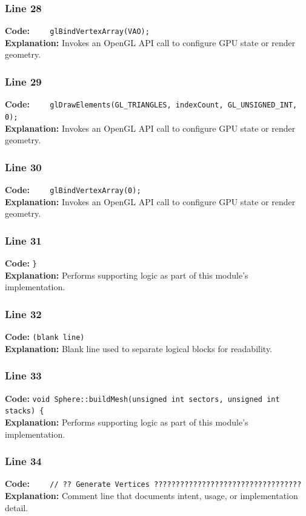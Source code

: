 \documentclass[11pt,a4paper]{article}
\begin{document}
\subsubsection*{Line 28}
\textbf{Code:} \verb|    glBindVertexArray(VAO);|\\
\textbf{Explanation:} Invokes an OpenGL API call to configure GPU state or render geometry.

\subsubsection*{Line 29}
\textbf{Code:} \verb|    glDrawElements(GL_TRIANGLES, indexCount, GL_UNSIGNED_INT, 0);|\\
\textbf{Explanation:} Invokes an OpenGL API call to configure GPU state or render geometry.

\subsubsection*{Line 30}
\textbf{Code:} \verb|    glBindVertexArray(0);|\\
\textbf{Explanation:} Invokes an OpenGL API call to configure GPU state or render geometry.

\subsubsection*{Line 31}
\textbf{Code:} \verb|}|\\
\textbf{Explanation:} Performs supporting logic as part of this module's implementation.

\subsubsection*{Line 32}
\textbf{Code:} \texttt{(blank line)}\\
\textbf{Explanation:} Blank line used to separate logical blocks for readability.

\subsubsection*{Line 33}
\textbf{Code:} \verb|void Sphere::buildMesh(unsigned int sectors, unsigned int stacks) {|\\
\textbf{Explanation:} Performs supporting logic as part of this module's implementation.

\subsubsection*{Line 34}
\textbf{Code:} \verb|    // ?? Generate Vertices ??????????????????????????????????|\\
\textbf{Explanation:} Comment line that documents intent, usage, or implementation detail.
\end{document}
